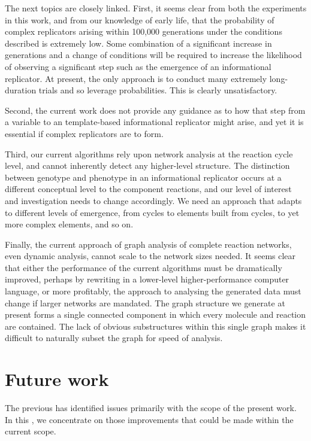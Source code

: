 The next topics are closely linked. First, it seems clear from both the experiments in this work, and from our knowledge of early life, that the probability of complex replicators arising within 100,000 generations under the conditions described is extremely low. Some combination of a significant increase in generations and a change of conditions will be required to increase the likelihood of observing a significant step such as the emergence of an informational replicator. At present, the only approach is to conduct many extremely long-duration trials and so leverage probabilities. This is clearly unsatisfactory.

Second, the current work does not provide any guidance as to how that step from a variable to an template-based informational replicator might arise, and yet it is essential if complex replicators are to form. 

Third, our current algorithms rely upon network analysis at the reaction cycle level, and cannot inherently detect any higher-level structure. The distinction between genotype and phenotype in an informational replicator occurs at a different conceptual level to the component reactions, and our level of interest and investigation needs to change accordingly. We need an approach that adapts to different levels of emergence, from cycles to elements built from cycles, to yet more complex elements, and so on. 

Finally, the current approach of graph analysis of complete reaction networks, even dynamic analysis, cannot scale to the network sizes needed. It seems clear that either the performance of the current algorithms must be dramatically improved, perhaps by rewriting in a lower-level higher-performance computer language, or more profitably, the approach to analysing the generated data must change if larger networks are mandated. The graph structure we generate at present forms a single connected component in which every molecule and reaction are contained. The lack of obvious substructures within this single graph makes it difficult to naturally subset the graph for speed of analysis.

\section{Future work}\label{sec:future-work}

The previous  has identified issues primarily with the scope of the present work. In this , we concentrate on those improvements that could be made within the current scope. 


